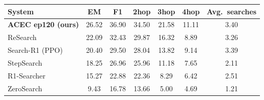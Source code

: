 \begin{tabular}{lcccccc}
\toprule
System & EM & F1 & 2hop & 3hop & 4hop & Avg.\ searches \\
\midrule
\textbf{ACEC ep120 (ours)} & 26.52 & 36.90 & 34.50 & 21.58 & 11.11 & 3.40 \\
ReSearch & 22.09 & 32.43 & 29.87 & 16.32 & 8.89 & 3.26 \\
Search-R1 (PPO) & 20.40 & 29.50 & 28.04 & 13.82 & 9.14 & 3.39 \\
StepSearch & 18.25 & 26.96 & 25.96 & 11.18 & 7.65 & 2.11 \\
R1-Searcher & 15.27 & 22.88 & 22.36 & 8.29 & 6.42 & 2.51 \\
ZeroSearch & 9.43 & 16.78 & 13.66 & 5.00 & 4.69 & 1.21 \\
\bottomrule
\end{tabular}

